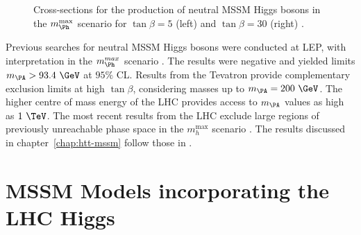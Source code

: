 \begin{figure}[htbp]
\caption[Cross-sections for the production of neutral MSSM Higgs bosons in the 
$m_{\Ph}^{\text{max}}$ scenario.]{Cross-sections for the production of neutral MSSM Higgs bosons in the 
$m_{\Ph}^{\text{max}}$ scenario for $\tan\beta=5$ (left) and $\tan\beta=30$
(right) \cite{Heinemeyer:2013tqa}.}
\label{fig:mhmaxXSs}
\end{figure}

Previous searches for neutral \ac{MSSM} Higgs bosons were conducted at LEP, with
interpretation in the $m_{\Ph}^{max}$ scenario \cite{Schael:2006cr}.
The results were negative and yielded limits $m_{\PA} > 93.4~\GeV$ at $95\%$ CL.  
Results from the Tevatron \cite{Benjamin:2010xb} provide complementary exclusion 
limits at high $\tan\beta$, considering masses up to $m_{\PA}=200~\GeV$. The
higher centre of mass energy of the LHC provides access to $m_{\PA}$ values as
high as $1~\TeV$. The most recent results from the LHC exclude large regions of
previously unreachable phase space in the $m_{h}^{\text{max}}$ scenario
\cite{Aad:2014vgg,HIG-13-021}. The results discussed in
chapter~\ref{chap:htt-mssm} follow those in \cite{HIG-13-021}.

\section{MSSM Models incorporating the LHC Higgs}
\label{sec:mssmbenchmarks}

